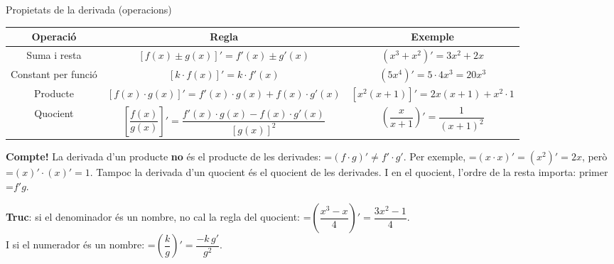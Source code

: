 \documentclass[11pt,a4paper]{article}
\newcommand{\fmm}[1]{\setbox0=\hbox{$#1$}\ifdim\wd0>\linewidth\[#1\]\else\mbox{\box0}\fi}
\newcommand{\fmuline}[1]{\textbf{\color{fmaccent}#1}}
\begin{document}
  
\begin{fmprop}{Propietats de la derivada (operacions)}
\begin{center}\renewcommand{\arraystretch}{1.5}\begin{tabular}{ccc}\toprule
\textbf{Operació} & \textbf{Regla} & \textbf{Exemple}\\\midrule
Suma i resta & $[f(x)\pm g(x)]'=f'(x)\pm g'(x)$ & $(x^3+x^2)'=3x^2+2x$\\
Constant per funció & $[k\cdot f(x)]'=k\cdot f'(x)$ & $(5x^4)'=5\cdot4x^3=20x^3$\\
Producte & $[f(x)\cdot g(x)]'=f'(x)\cdot g(x)+f(x)\cdot g'(x)$ & $[x^2(x+1)]'=2x(x+1)+x^2\cdot1$\\[2ex]
Quocient & $\left[\dfrac{f(x)}{g(x)}\right]'=\dfrac{f'(x)\cdot g(x)-f(x)\cdot g'(x)}{[g(x)]^2}$ & $\left(\dfrac{x}{x+1}\right)'=\dfrac{1}{(x+1)^2}$\\[2ex]
\bottomrule\end{tabular}\end{center}

      
\begin{fmnote}\fmuline{Compte!} La derivada d'un producte \textbf{no} és el producte de les derivades: \fmm{(f\cdot g)'\neq f'\cdot g'}. Per exemple, \fmm{(x\cdot x)'=(x^2)'=2x}, però \fmm{(x)'\cdot(x)'=1}. Tampoc la derivada d'un quocient és el quocient de les derivades. I en el quocient, l'ordre de la resta importa: primer \fmm{f'g}.\end{fmnote}

      
\begin{fmnote}\fmuline{Truc}: si el denominador és un nombre, no cal la regla del quocient: \fmm{\left(\dfrac{x^3-x}{4}\right)'=\dfrac{3x^2-1}{4}}. \\
I si el numerador és un nombre: \fmm{\left(\dfrac{k}{g}\right)'=\dfrac{-k\,g'}{g^2}}.\end{fmnote}
\end{fmprop}
\end{document}
